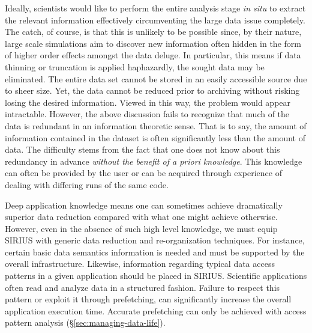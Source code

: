 Ideally, scientists would like to perform the entire analysis stage {\em in
situ} to extract the relevant information effectively circumventing the large
data issue completely.  The catch, of course, is that this
is unlikely to be possible since, by their nature, large scale simulations aim
to discover new information often hidden in the form of higher order
effects amongst the data deluge. In particular, this means if data thinning or
truncation is applied haphazardly, the sought data may be eliminated.
The
entire data set cannot be stored in an easily accessible source due to sheer size. Yet, the data cannot 
be reduced prior to archiving without risking losing the desired information.
Viewed in this way, the problem would appear
intractable. However, the above discussion fails to recognize that much of the
data is redundant in an information theoretic sense.  That is to say, the
amount of information contained in the dataset is often significantly less than
the amount of data.  The difficulty stems from the fact that one does not know
about this redundancy in advance \emph{without the benefit of a priori
knowledge}. This knowledge can often be provided by the user or can be acquired
through experience of dealing with differing runs of the same code. 

Deep application knowledge means one can sometimes achieve dramatically superior
data reduction compared with what one might achieve otherwise.
However, even in the absence of such high level knowledge, we must equip SIRIUS with generic data reduction and re-organization
techniques. For instance, certain basic data semantics information 
is needed and must be supported by the overall infrastructure. Likewise,
information regarding typical data access patterns in a given application
should be placed in SIRIUS. Scientific applications often read and
analyze data in a structured fashion. Failure to respect this pattern or 
exploit it through prefetching, can significantly increase the overall
application execution time. Accurate prefetching can only be achieved
with access pattern analysis (\S\ref{sec:managing-data-life}). 


